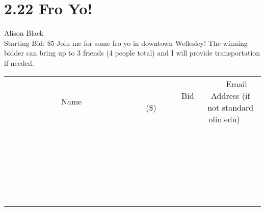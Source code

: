 \documentclass[11pt]{article}
\begin{document}
\section*{2.22 Fro Yo!}
Alison Black
\\
Starting Bid: \$5
\newline
Join me for some fro yo in downtown Wellesley!  The winning bidder can bring up to 3 friends (4 people total) and I will provide transportation if needed.
\\[6ex]
\begin{tabular}{c c c}
~~~~~~~~~~~~~Name~~~~~~~~~~~~~ & ~~~~~~~~~Bid (\$)~~~~~~~~~  & ~~~Email Address (if not standard olin.edu)~~~\\
 & & \\
\hline
 & & \\
\hline
 & & \\
\hline
 & & \\
\hline
 & & \\
\hline
 & & \\
\hline
 & & \\
\hline
 & & \\
\hline
 & & \\
\hline
 & & \\
\hline
 & & \\
\hline
 & & \\
\hline
 & & \\
\hline
 & & \\
\hline
 & & \\
\hline
 & & \\
\hline
 & & \\
\hline
 & & \\
\hline
 & & \\
\hline
 & & \\
\hline
 & & \\
\hline
 & & \\
\hline
 & & \\
\hline
 & & \\
\hline
 & & \\
\hline
 & & \\
\hline
\end{tabular}
\newpage
\end{document}
